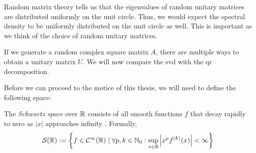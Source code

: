 Random matrix theory tells us that the eigenvalues of random unitary matrices are distributed uniformly on the unit circle.
Thus, we would expect the spectral density to be uniformly distributed on the unit circle as well.
This is important as we think of the choice of random unitary matrices.

If we generate a random complex square matrix $A$,
there are multiple ways to obtain a unitary matrix $U$.
We will now compare the svd with the qr decomposition.

Before we can proceed to the motice of this thesis, we will need to define the following space:

\begin{definition} \label{def:Schwartz space}
    The \emph{Schwartz space} over $\mathbb{R}$ consists of all smooth functions $f$ that decay rapidly to zero as $|x|$ approaches infinity \cite{richtmyer}.
    Formally,
    \[
    \mathcal{S}(\mathbb{R}) := \left\{f \in \mathcal{C}^{\infty}(\mathbb{R}) \mid \forall p, k \in \mathbb{N}_0: \sup_{x \in \mathbb{R}} \left| x^p f^{(k)}(x) \right| < \infty \right\}
    \]
\end{definition}